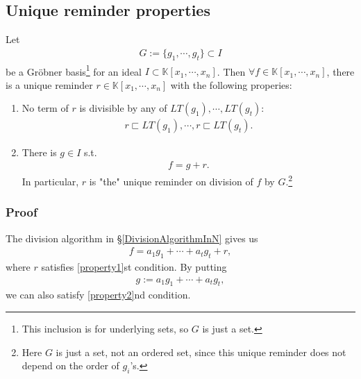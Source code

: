 \documentclass[11pt]{book}
\begin{document}
\subsection{Unique reminder properties}
\label{UniqueReminderProperties}
Let
\begin{eqnarray}
G := \{g_1, \cdots, g_t\} \subset I
\end{eqnarray}
be a Gr\"obner basis\footnote{This inclusion is for underlying sets, so $G$ is just a set.} for an ideal $I \subset \mathbb{K}[x_1, \cdots, x_n]$.
Then $\forall f \in \mathbb{K}[x_1, \cdots, x_n]$, there is a unique reminder $r \in \mathbb{K}[x_1, \cdots, x_n]$ with the following properies:
\begin{enumerate}
\item 
\label{property1}
No term of $r$ is divisible by any of $LT(g_1), \cdots, LT(g_t)$:
\begin{eqnarray}
r \sqsubset LT(g_1), \cdots, r \sqsubset LT(g_t).
\end{eqnarray}

\item 
\label{property2}
There is $g \in I$ s.t.
\begin{eqnarray}
f = g + r.
\end{eqnarray}
In particular, $r$ is "the" unique reminder on division of $f$ by $G$.\footnote{Here $G$ is just a set, not an ordered set, since this unique reminder does not depend on the order of $g_i$'s.}
\end{enumerate}

\subsubsection{Proof}
The division algorithm in \S\ref{DivisionAlgorithmInN} gives us
\begin{eqnarray}
f = a_1 g_1 + \cdots + a_t g_t + r,
\end{eqnarray}
where $r$ satisfies \ref{property1}st condition.
By putting
\begin{eqnarray}
g := a_1 g_1 + \cdots + a_t g_t,
\end{eqnarray}
we can also satisfy \ref{property2}nd condition.
\end{document}
